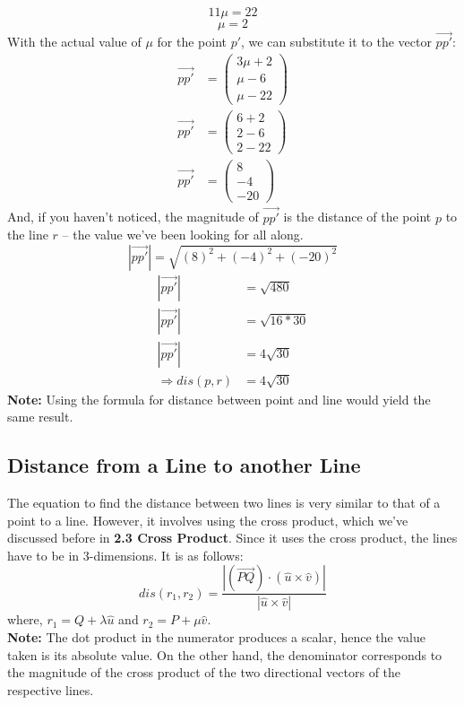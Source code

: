 \documentclass[hidelinks, a4paper, 12pt]{article}
\newcommand{\bd}{\textbf}
\newcommand{\thus}{\Rightarrow}
\newcommand{\n}{\\[\baselineskip]}
\begin{document}
                \[11\mu = 22\]
                \[\mu = 2\]
                With the actual value of $\mu$ for the point $p'$, we can substitute it to the vector $\vec{pp'}$:
                \[\begin{split}
                    \vec{pp'} &= \begin{pmatrix} 3\mu + 2 \\ \mu - 6\\ \mu -22\end{pmatrix}\\
                    \vec{pp'} &= \begin{pmatrix} 6 + 2 \\ 2 - 6\\ 2 -22\end{pmatrix}\\
                    \vec{pp'} &= \begin{pmatrix} 8 \\ -4 \\ -20\end{pmatrix}
                \end{split}\]
                And, if you haven't noticed, the magnitude of $\vec{pp'}$ is the distance of the point $p$ to the line $r$ -- the value we've been looking for all along.
                \[|\vec{pp'}| = \sqrt{(8)^2 + (-4)^2 + (-20)^2}\]
                \[\begin{split}
                    |\vec{pp'}| &= \sqrt{480}\\
                    |\vec{pp'}| &= \sqrt{16*30}\\
                    |\vec{pp'}| &= 4\sqrt{30}\\
                    \thus dis(p, r) &= 4\sqrt{30}
                \end{split}\]
                \bd{Note: }Using the formula for distance between point and line would yield the same result.
            
        \subsection{Distance from a Line to another Line}
            The equation to find the distance between two lines is very similar to that of a point to a line. However, it involves
            using the cross product, which we've discussed before in \bd{2.3 Cross Product}. Since it uses the cross product,
            the lines have to be in 3-dimensions. It is as follows:
            \[dis(r_1, r_2) = \frac{|(\vec{PQ}) \cdot (\hat{u} \times \hat{v})|}{|\hat{u} \times \hat{v}|}\]
            where, $r_1 = Q + \lambda \hat{u}$ and $r_2 = P + \mu \hat{v}$.\n
            \bd{Note: }The dot product in the numerator produces a scalar, hence the value taken is its absolute value. On the other hand, the denominator corresponds to the magnitude
            of the cross product of the two directional vectors of the respective lines.
\end{document}
